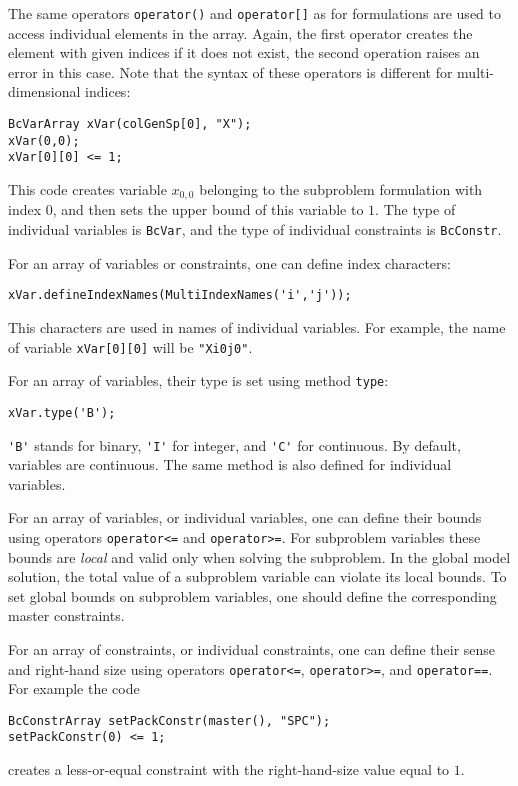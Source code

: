 \documentclass[10pt,a4paper]{article}
\begin{document}
The same operators \verb+operator()+ and \verb+operator[]+ as for formulations are used to access individual elements in
the array. Again, the first operator creates the element with given indices if it does not exist, the second operation
raises an error in this case. Note that the syntax of these operators is different for multi-dimensional indices:
\begin{lstlisting}
BcVarArray xVar(colGenSp[0], "X");
xVar(0,0); 
xVar[0][0] <= 1; 
\end{lstlisting}
This code creates variable $x_{0,0}$ belonging to the subproblem formulation with index $0$, and then sets the upper
bound of this variable to $1$. The type of individual variables is \verb+BcVar+, and the type of individual constraints
is \verb+BcConstr+. 


For an array of variables or constraints, one can define index characters:
\begin{lstlisting}
xVar.defineIndexNames(MultiIndexNames('i','j'));
\end{lstlisting}
This characters are used in names of individual variables. For example, the name of variable \verb+xVar[0][0]+ will be
\verb+"Xi0j0"+.
 
For an array of variables, their type is set using method \verb+type+:
\begin{lstlisting}
xVar.type('B');
\end{lstlisting}
\verb+'B'+ stands for binary, \verb+'I'+ for integer, and \verb+'C'+ for continuous. By default, variables are
continuous. The same method is also defined for individual variables. 

For an array of variables, or individual variables, one can define their bounds using operators \verb+operator<=+ and
\verb+operator>=+. For subproblem variables these bounds are \emph{local} and valid only when solving the subproblem. In
the global model solution, the total value of a subproblem variable can violate its local bounds. To set global
bounds on subproblem variables, one should define the corresponding master constraints.

For an array of constraints, or individual constraints, one can define their sense and right-hand size using operators
\verb+operator<=+, \verb+operator>=+, and \verb+operator==+. For example the code 
\begin{lstlisting}
BcConstrArray setPackConstr(master(), "SPC");
setPackConstr(0) <= 1; 
\end{lstlisting}
creates a less-or-equal constraint with the right-hand-size value equal to $1$.
\end{document}
